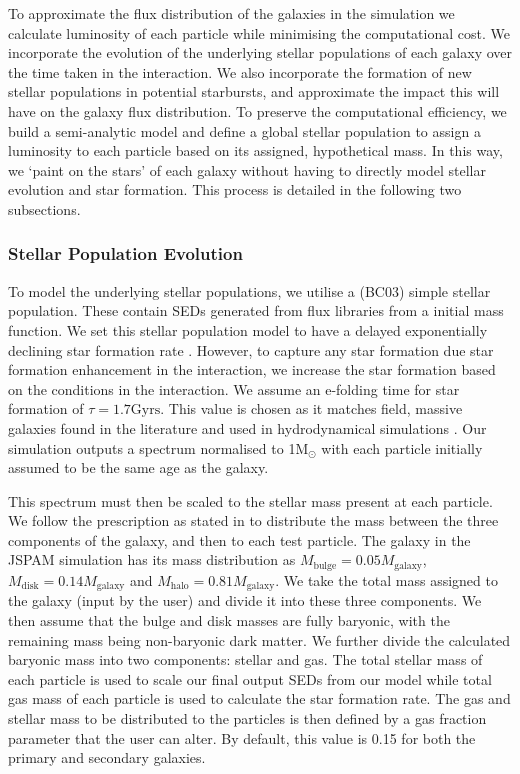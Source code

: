 To approximate the flux distribution of the galaxies in the simulation we calculate luminosity of each particle while minimising the computational cost. We incorporate the evolution of the underlying stellar populations of each galaxy over the time taken in the interaction. We also incorporate the formation of new stellar populations in potential starbursts, and approximate the impact this will have on the galaxy flux distribution. To preserve the computational efficiency, we build a semi-analytic model and define a global stellar population to assign a luminosity to each particle based on its assigned, hypothetical mass. In this way, we `paint on the stars' of each galaxy without having to directly model stellar evolution and star formation. This process is detailed in the following two subsections. 

\subsubsection{Stellar Population Evolution}\label{Stellar_Pop_Evol}
To model the underlying stellar populations, we utilise a \citet{2003MNRAS.344.1000B} (BC03) simple stellar population. These contain SEDs generated from flux libraries from a \citet{2003PASP..115..763C} initial mass function. We set this stellar population model to have a delayed exponentially declining star formation rate \citep{2009ApJ...690..802J, 2013ApJ...762L..15P,2014arXiv1404.0402S, 2019A&A...622A.103B}. However, to capture any star formation due star formation enhancement in the interaction, we increase the star formation based on the conditions in the interaction. We assume an e-folding time for star formation of $\tau = 1.7\text{Gyrs}$. This value is chosen as it matches field, massive galaxies found in the literature \citep[e.g][]{2010ApJ...721..193P} and used in hydrodynamical simulations \citep[e.g.][]{2022ApJ...941....5J}. Our simulation outputs a spectrum normalised to 1M$_{\odot}$ with each particle initially assumed to be the same age as the galaxy.

This spectrum must then be scaled to the stellar mass present at each particle. We follow the prescription as stated in \citet{2016A&C....16...26W} to distribute the mass between the three components of the galaxy, and then to each test particle. The galaxy in the JSPAM simulation has its mass distribution as $M_{\text{bulge}} = 0.05M_{\text{galaxy}}$, $M_{\text{disk}} = 0.14M_{\text{galaxy}}$ and $M_{\text{halo}} = 0.81M_{\text{galaxy}}$. We take the total mass assigned to the galaxy (input by the user) and divide it into these three components. We then assume that the bulge and disk masses are fully baryonic, with the remaining mass being non-baryonic dark matter. We further divide the calculated baryonic mass into two components: stellar and gas. The total stellar mass of each particle is used to scale our final output SEDs from our model while total gas mass of each particle is used to calculate the star formation rate. The gas and stellar mass to be distributed to the particles is then defined by a gas fraction parameter that the user can alter. By default, this value is 0.15 for both the primary and secondary galaxies.


